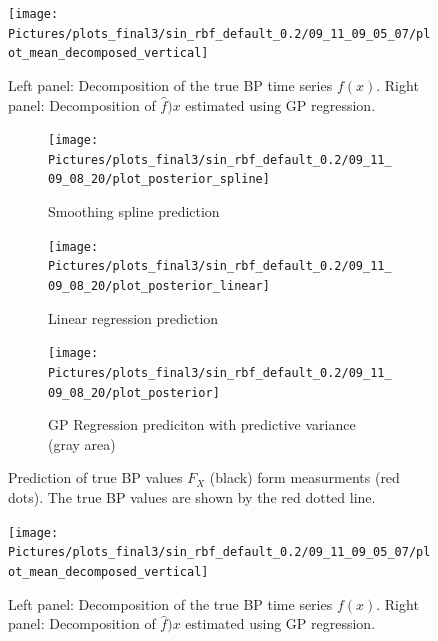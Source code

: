\begin{figure}[!ht]
\centering
    \texttt{[image: Pictures/plots\_final3/sin\_rbf\_default\_0.2/09\_11\_09\_05\_07/plot\_mean\_decomposed\_vertical]}
\caption[Decomposed BP time sereis]{Left panel: Decomposition of the true BP time series $f(x)$. Right panel:
Decomposition of $\hat{f})x$ estimated using GP regression.}
\label{fig:ex2-gp-prediction}
\end{figure}

\begin{figure}[!ht]
\centering

\begin{subfigure}{.45\textwidth}
    \centering
    \texttt{[image: Pictures/plots\_final3/sin\_rbf\_default\_0.2/09\_11\_09\_08\_20/plot\_posterior\_spline]}
  \caption[Spline]{Smoothing spline prediction}
  \label{fig:ex2-spline}
\end{subfigure}\hfill
\begin{subfigure}{.45\textwidth}
    \centering
    \texttt{[image: Pictures/plots\_final3/sin\_rbf\_default\_0.2/09\_11\_09\_08\_20/plot\_posterior\_linear]}
  \caption[Linear Regression]{Linear regression prediction}
  \label{fig:ex2-linear}
\end{subfigure}
\begin{subfigure}{0.6\textwidth}
    \centering
    \texttt{[image: Pictures/plots\_final3/sin\_rbf\_default\_0.2/09\_11\_09\_08\_20/plot\_posterior]}
  \caption[GP Prediction]{GP Regression prediciton with predictive variance (gray area)}
  \label{fig:ex2-gp}
\end{subfigure}
\caption[True BP value prediction]{Prediction of true BP values $F_X$ (black) form measurments (red dots). The true BP values are shown
by the red dotted line. }
\label{fig:ex2}
\end{figure}



\begin{figure}[!ht]
\centering
    \texttt{[image: Pictures/plots\_final3/sin\_rbf\_default\_0.2/09\_11\_09\_05\_07/plot\_mean\_decomposed\_vertical]}
\caption[Decomposed BP time sereis]{Left panel: Decomposition of the true BP time series $f(x)$. Right panel:
Decomposition of $\hat{f})x$ estimated using GP regression.}
\label{fig:ex2-gp-prediction}
\end{figure}

